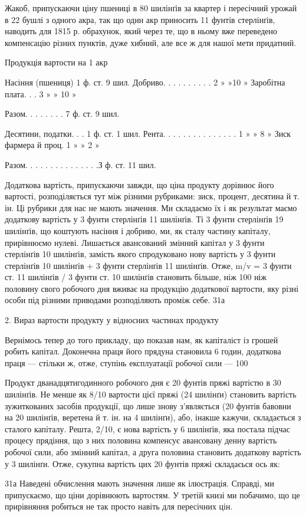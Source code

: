Жакоб, припускаючи ціну пшениці в 80 шилінґів за квартер і пересічний урожай в 22 бушлі з одного
акра, так що один акр приносить 11 фунтів стерлінґів, наводить для 1815 р. обрахунок, який через те,
що в ньому вже переведено компенсацію різних
пунктів, дуже хибний, але все ж для нашої мети придатний.

Продукція вартости на 1 акр

Насіння (пшениця) 1 ф. ст. 9 шил.
Добриво. . . . . . . . . . 2  » »10 »
Заробітна плата. . . 3 » »  10 »

Разом. . . . . . .  . 7 ф. ст. 9 шил.

Десятини, податки. . . 1 ф. ст. 1 шил.
Рента. . . . . . . . . . . . . . . 1 » » 8 »
Зиск фармера й проц. 1 » » 2 »

Разом. . . . . . . . . . . . . . .З ф. ст. 11 шил.

Додаткова вартість, припускаючи завжди, що ціна продукту дорівнює його вартості, розподіляється тут
між різними рубриками: зиск, процент, десятина й т. ін. Ці рубрики для нас не мають значення. Ми
складаємо їх і як результат маємо додаткову вартість у 3 фунти стерлінґів 11 шилінґів. Ті 3 фунти
стерлінґів 19 шилінґів, що коштують насіння і добриво, ми, як сталу частину капіталу, прирівнюємо
нулеві. Лишається авансований змінний капітал у 3 фунти стерлінґів 10 шилінґів, замість якого
спродуковано нову вартість у 3 фунти стерлінґів 10 шилінґів + 3 фунти стерлінґів 11 шилінґів. Отже,
m/v = 3 фунти ст. 11 шилінґів / 3 фунти ст. 10 шилінґів становить більше, ніж 100%
ніж половину свого робочого дня вживає на продукцію додаткової вартости, яку різні особи під різними
приводами  розподіляють проміж себе. 31а

2. Вираз вартости продукту у відносних частинах продукту

Вернімось тепер до того прикладу, що показав нам, як капіталіст із грошей робить капітал. Доконечна
праця його прядуна
становила 6 годин, додаткова праця — стільки ж, отже, ступінь експлуатації робочої сили — 100%

Продукт дванадцятигодинного робочого дня є 20 фунтів пряжі вартістю в 30 шилінґів. Не менше як 8/10
вартости цієї пряжі (24 шилінґи) становить вартість зужиткованих засобів продукції, що лише знову
з’являється (20 фунтів бавовни на 20 шилінґів, веретена й т. ін. на 4 шилінґи), або, інакше кажучи,
складається з сталого капіталу. Решта, 2/10, є нова вартість у 6 шилінґів, яка постала підчас
процесу прядіння, що з них половина компенсує авансовану денну вартість робочої сили, або змінний
капітал, а друга половина становить додаткову вартість у 3 шилінґи. Отже, сукупна вартість цих 20
фунтів пряжі складаєься ось як:

31а Наведені обчислення мають значення лише як ілюстрація. Справді, ми припускаємо, що ціни
дорівнюють вартостям. У третій книзі ми побачимо,
що це прирівняння робиться не так просто навіть для пересічних цін.
